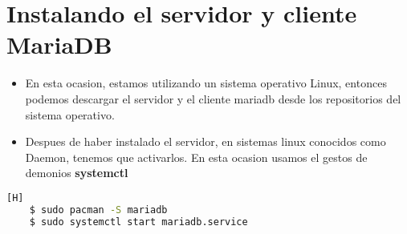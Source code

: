 \newpage %
\section{Instalando el servidor y cliente MariaDB}
\begin{itemize}
  \item En esta ocasion, estamos utilizando un sistema operativo Linux, entonces podemos descargar el servidor y el cliente mariadb desde los repositorios del sistema operativo.  
  \item Despues de haber instalado el servidor, en sistemas linux conocidos como Daemon, tenemos que activarlos. En esta ocasion usamos el gestos de demonios \textbf{systemctl}
\end{itemize}

\begin{lstlisting}[language=bash,caption={Descargando el servidor y el cliente MariaDB}][H]
	$ sudo pacman -S mariadb
	$ sudo systemctl start mariadb.service
\end{lstlisting}
